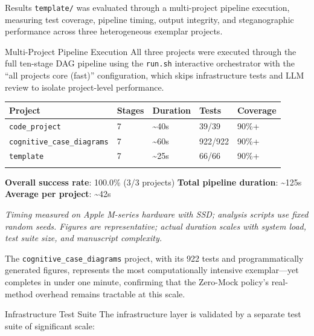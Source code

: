\documentclass[
  ignorenonframetext,
]{beamer}
\author{\texorpdfstring{}{}}
\date{}
\newcounter{none} %
\begin{document}
\begin{frame}[fragile]{Results}
\protect{}\label{results}
\texttt{template/} was evaluated through a multi-project pipeline
execution, measuring test coverage, pipeline timing, output integrity,
and steganographic performance across three heterogeneous exemplar
projects.

\begin{block}{Multi-Project Pipeline Execution}
\protect{}\label{multi-project-pipeline-execution}
All three projects were executed through the full ten-stage DAG pipeline
using the \texttt{run.sh} interactive orchestrator with the ``all
projects core (fast)'' configuration, which skips infrastructure tests
and LLM review to isolate project-level performance.

{\def\LTcaptype{none} %
\begin{longtable}[]{@{}lllll@{}}
\toprule\noalign{}
Project & Stages & Duration & Tests & Coverage \\
\midrule\noalign{}
\endhead
\texttt{code\_project} & 7 & \textasciitilde40s & 39/39 & 90\%+ \\
\texttt{cognitive\_case\_diagrams} & 7 & \textasciitilde60s & 922/922 &
90\%+ \\
\texttt{template} & 7 & \textasciitilde25s & 66/66 & 90\%+ \\
\bottomrule\noalign{}
\end{longtable}
}

\textbf{Overall success rate}: 100.0\% (3/3 projects) \textbf{Total
pipeline duration}: \textasciitilde125s \textbf{Average per project}:
\textasciitilde42s

\emph{Timing measured on Apple M-series hardware with SSD; analysis
scripts use fixed random seeds. Figures are representative; actual
duration scales with system load, test suite size, and manuscript
complexity.}

The \texttt{cognitive\_case\_diagrams} project, with its 922 tests and
programmatically generated figures, represents the most computationally
intensive exemplar---yet completes in under one minute, confirming that
the Zero-Mock policy's real-method overhead remains tractable at this
scale.
\end{block}

\begin{block}{Infrastructure Test Suite}
\protect{}\label{infrastructure-test-suite}
The infrastructure layer is validated by a separate test suite of
significant scale:


\end{block}
\end{frame}
\end{document}

